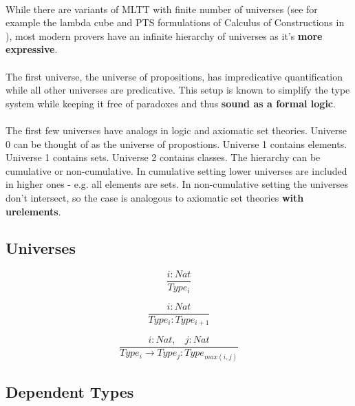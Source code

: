\documentclass[11pt,oneside]{article}
\begin{document}
\paragraph{}
While there are variants of MLTT with finite number of universes (see
for example the lambda cube and PTS formulations of Calculus of
Constructions in \cite{henk1}), most modern provers have an infinite
hierarchy of universes as it's {\bf more expressive}.

\paragraph{}
The first universe, the universe of propositions, has impredicative quantification while all other universes are predicative. This setup
is known to simplify the type system while keeping it free of
paradoxes and thus {\bf sound as a formal logic}.

\paragraph{}
The first few universes have analogs in logic and axiomatic set theories.  Universe 0 can be thought of as the universe of propostions. Universe 1 contains elements.  Universe 1 contains sets. Universe 2 contains classes.  The hierarchy can be cumulative or non-cumulative. In cumulative
setting lower universes are included in higher ones - e.g. all elements
are sets. In non-cumulative setting the universes don't intersect,
so the case is analogous to axiomatic set theories {\bf with urelements}.

\subsection{Universes}

\begin{equation}
\tag{sorts}
\dfrac
  {i : Nat}
  {Type_i}
\end{equation}

\begin{equation}
\tag{axioms}
\dfrac
  {i: Nat}
  {Type_i : Type_{i+1}}
\end{equation}

\begin{equation}
\tag{rules}
\dfrac
  {i : Nat,\ \ \ \ j : Nat}
  {Type_i \rightarrow Type_{j} : Type_{max(i,j)}}
\end{equation}

  \subsection{Dependent Types}
\end{document}
